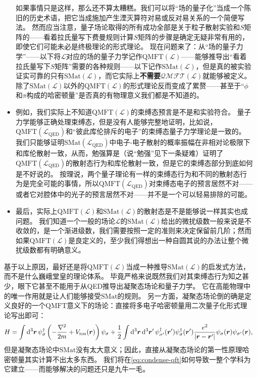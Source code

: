 \documentclass[hyperref, UTF8, a4paper]{ctexbook}
\renewcommand{\emph}{\textbf}
\newcommand{\soliddoc}{\href{../solid/solid}{固体物理笔记}}
\begin{document}
\begin{itemize}
    如果事情只是这样，那么还不算太糟糕。我们可以将“场的量子化”当成一个陈旧的历史术语，把它当成施加产生湮灭算符对易或反对易关系的一个简便写法。
    然而应当注意，量子场论取得的所有成功全部是关于粒子散射实验和$S$矩阵的——看着拉氏量写下费曼规则计算$S$矩阵的步骤是确定无疑非常有用的，即使它们可能未必是终极理论的形式理论。
    现在问题来了：从“场的量子力学”——以下将$\mathcal{L}$对应的场的量子力学记作$\mathrm{QMFT}(\mathcal{L})$——能够推导出“看着拉氏量写下$S$矩阵”需要的各种规则——以下记作$\mathrm{SMat}(\mathcal{L})$，但是真的被实验证实可靠的只有$\mathrm{SMat}(\mathcal{L})$，而它实际上\emph{不需要}$\mathcal{QMFT}(\mathcal{L})$就能够被定义。
    除了$\mathrm{SMat}(\mathcal{L})$以外的$\mathrm{QMFT}(\mathcal{L})$的形式理论反而变成了累赘——甚至于“$\phi$和$\pi$构成的哈密顿量”是否真的有物理意义我们都是不知道的。
    \item 例如，我们实际上不知道$\mathrm{QMFT}(\mathcal{L})$的束缚态预言是不是和实验符合。
    量子力学能够正确处理束缚态，但是没有人能够完整地证明，比如说，$\mathrm{QMFT}(\mathcal{L}_\text{QED})$和“彼此库伦排斥的电子”的束缚态量子力学理论是一致的。
    我们只能够证明$\mathrm{SMat}(\mathcal{L}_\text{QED})$中电子-电子散射的概率振幅在非相对论极限下和库伦散射一致，从而，勉强算是（说“勉强”见下一条疑难）证明了$\mathrm{QMFT}(\mathcal{L}_\text{QED})$的散射态行为和库伦散射一致，但是它的束缚态部分到底如何是不好说的。
    按理说，两个量子理论有一样的束缚态行为和不同的散射态行为是完全可能的事情，所以$\mathrm{QMFT}(\mathcal{L}_\text{QED})$对束缚态电子的预言居然不对——或者它对腔体中的光子的预言居然不对——并不是一个可以轻易排除的可能。
    \item 最后，实际上$\mathrm{QMFT}(\mathcal{L})$和$\mathrm{SMat}(\mathcal{L})$的散射态是不是能够说一样其实也成问题。
    我们知道一个一般的场论$\mathcal{L}$的$\mathrm{SMat}(\mathcal{L})$给出的微扰级数一般来说是不收敛的，是一个渐进级数，我们需要按照一定的准则来决定保留前几阶；然而如果$\mathrm{QMFT}(\mathcal{L})$是良定义的，至少我们得想出一种自圆其说的办法让整个微扰级数都有明确意义。
\end{itemize}

基于以上原因，最好还是将$\mathrm{QMFT}(\mathcal{L})$当成一种推导$\mathrm{SMat}(\mathcal{L})$的启发式方法，而不是什么巍峨堂皇的理论体系。
毕竟严格来说既然我们对其束缚态行为知之甚少，眼下它甚至不能用于从QED推导出凝聚态场论和量子力学。
它在高能物理中的唯一作用就是让人们能够接受$\mathrm{SMat}$的规则。
另一方面，凝聚态场论倒的确是定义良好的一个$\mathrm{QMFT}$意义下的场论：直接将多电子哈密顿量用二次量子化形式理论写出即可：
\begin{equation}
    H = \int \dd[3]{\vb*{r}} \psi^\dagger_\sigma \left( - \frac{\laplacian}{2m} + V_\text{ion}(\vb*{r}) \right) \psi_\sigma + \frac{1}{2} \int \dd[3]{\vb*{r}} \dd[3]{\vb*{r}'} \psi^\dagger_{\sigma'}(\vb*{r}') \psi^\dagger_\sigma(\vb*{r}') \frac{e^2}{\abs{\vb*{r} - \vb*{r}'}} \psi_\sigma(\vb*{r}) \psi_{\sigma'}(\vb*{r}),
    \label{eq:condense-qft}
\end{equation}
但是凝聚态场论中$\mathrm{SMat}$没有太大意义；因此，直接从凝聚态场论的第一性原理哈密顿量其实计算不出太多东西。
我们将在\eqref{eq:condense-qft}如何导致一整个学科为它建立——而能够解决的问题还只是九牛一毛。
\end{document}

